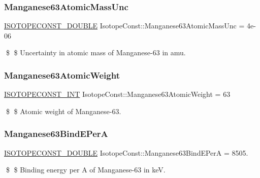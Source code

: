 \subsubsection{\texorpdfstring{Manganese63\+Atomic\+Mass\+Unc}{Manganese63AtomicMassUnc}}
{\footnotesize\ttfamily \mbox{\hyperlink{group___isotope_const-_macros_ga8f45a7272ce02c0b4c65c44636ed719a}{I\+S\+O\+T\+O\+P\+E\+C\+O\+N\+S\+T\+\_\+\+D\+O\+U\+B\+LE}} Isotope\+Const\+::\+Manganese63\+Atomic\+Mass\+Unc = 4e-\/06}

\$ \$ Uncertainty in atomic mass of Manganese-\/63 in amu. \mbox{\label{group___isotope_const-_manganese-_mn63_ga1bebbe915db9b2ea8343ab99ff8bf1b3}} 
\subsubsection{\texorpdfstring{Manganese63\+Atomic\+Weight}{Manganese63AtomicWeight}}
{\footnotesize\ttfamily \mbox{\hyperlink{group___isotope_const-_macros_ga5f18360b3e99483a35c32d789e62621c}{I\+S\+O\+T\+O\+P\+E\+C\+O\+N\+S\+T\+\_\+\+I\+NT}} Isotope\+Const\+::\+Manganese63\+Atomic\+Weight = 63}

\$ \$ Atomic weight of Manganese-\/63. \mbox{\label{group___isotope_const-_manganese-_mn63_gaa1f8f81db0973af7c08677655fe00bd2}} 
\subsubsection{\texorpdfstring{Manganese63\+Bind\+E\+PerA}{Manganese63BindEPerA}}
{\footnotesize\ttfamily \mbox{\hyperlink{group___isotope_const-_macros_ga8f45a7272ce02c0b4c65c44636ed719a}{I\+S\+O\+T\+O\+P\+E\+C\+O\+N\+S\+T\+\_\+\+D\+O\+U\+B\+LE}} Isotope\+Const\+::\+Manganese63\+Bind\+E\+PerA = 8505.}

\$ \$ Binding energy per A of Manganese-\/63 in keV. \mbox{\label{group___isotope_const-_manganese-_mn63_ga5c04478b450bdf40b80e760791f6410e}} 
